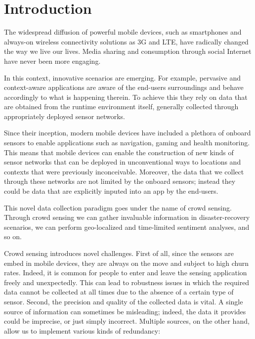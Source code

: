 \section{Introduction}
\label{sec:intro}

The widespread diffusion of powerful mobile devices, such as smartphones and always-on wireless connectivity solutions as 3G and LTE, have radically changed the way we live our lives. Media sharing and consumption through social Internet have never been more engaging.

In this context, innovative scenarios are emerging. For example, pervasive and context-aware applications are aware of the end-users surroundings and behave accordingly to what is happening therein. To achieve this they rely on data that are obtained from the runtime environment itself, generally collected through appropriately deployed sensor networks. 

Since their inception, modern mobile devices have included a plethora of onboard sensors to enable applications such as navigation, gaming and health monitoring. This means that mobile devices can enable the construction of new kinds of sensor networks that can be deployed in unconventional ways to locations and contexts that were previously inconceivable. Moreover, the data that we collect through these networks are not limited by the onboard sensors; instead they could be data that are explicitly inputed into an app by the end-users. 

This novel data collection paradigm goes under the name of crowd sensing. Through crowd sensing we can gather invaluable information in disaster-recovery scenarios, we can perform geo-localized and time-limited sentiment analyses, and so on.

Crowd sensing introduces novel challenges. First of all, since the sensors are embed in mobile devices, they are always on the move and subject to high churn rates. Indeed, it is common for people to enter and leave the sensing application freely and unexpectedly. This can lead to robustness issues in which the required data cannot be collected at all times due to the absence of a certain type of sensor. Second, the precision and quality of the collected data is vital. A single source of information can sometimes be misleading; indeed, the data it provides could be imprecise, or just simply incorrect. Multiple sources, on the other hand, allow us to implement various kinds of redundancy:

